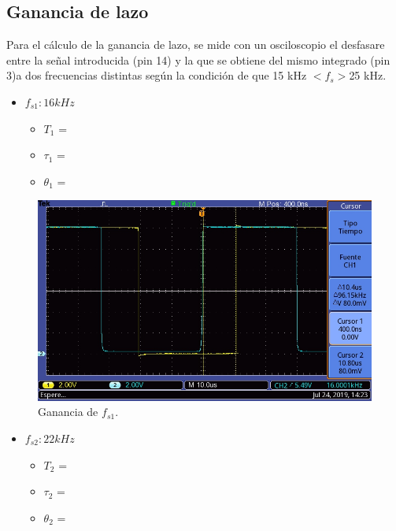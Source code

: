 \documentclass[twocolumn]{article}
\begin{document}
\subsection{Ganancia de lazo}
Para el cálculo de la ganancia de lazo, se mide con un osciloscopio el desfasare entre la señal introducida (pin 14) y la que se obtiene del mismo integrado (pin 3)a dos frecuencias distintas según la condición de que 15 kHz $< f_s > $25 kHz.

\begin{itemize}
	\item \textbf{$f_{s1}: 16 kHz$}
	  \begin{itemize}
		  \item $T_1$ =
		  \item $\tau_1$ =
		  \item $\theta_1$ =
	  \end{itemize}
\end{itemize}


\begin{figure}[H]
  \centering    
  \includegraphics[width=\columnwidth]{imagenes/osc1.jpg}
  \caption{Ganancia de $f_{s1}$.}\label{fig:osc1}
\end{figure}

\begin{itemize}[*]
	\item \textbf{$f_{s2}: 22 kHz$}
	  \begin{itemize}
		  \item $T_2$ =
		  \item $\tau_2$ =
		  \item $\theta_2$ =
	  \end{itemize}
\end{itemize}
\end{document}
